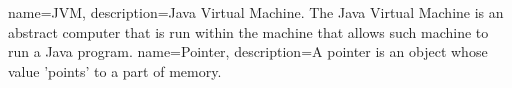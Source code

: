 {
    name=JVM,
    description={Java Virtual Machine. The Java Virtual Machine is an abstract computer that is run within the machine that allows such machine to run a Java program.}
}
{
    name=Pointer,
    description={A pointer is an object whose value 'points' to a part of memory.}
}
